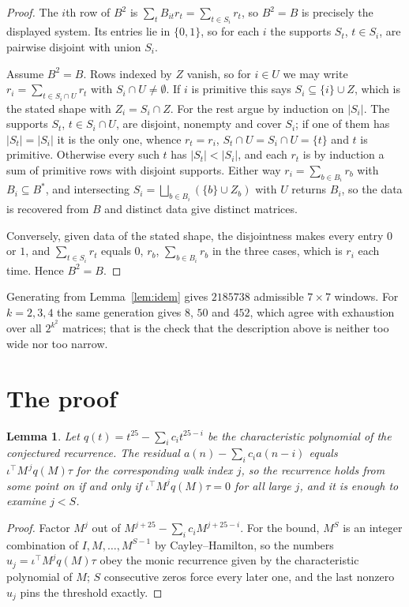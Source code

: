\documentclass[11pt,a4paper]{article}
\theoremstyle{plain}
\newtheorem{lemma}[theorem]{Lemma}
\theoremstyle{definition}
\begin{document}
\begin{proof}
The $i$th row of $B^2$ is $\sum_t B_{it}r_t=\sum_{t\in S_i}r_t$, so $B^2=B$ is precisely the
displayed system. Its entries lie in $\{0,1\}$, so for each $i$ the supports $S_t$,
$t\in S_i$, are pairwise disjoint with union $S_i$.

Assume $B^2=B$. Rows indexed by $Z$ vanish, so for $i\in U$ we may write
$r_i=\sum_{t\in S_i\cap U}r_t$ with $S_i\cap U\neq\emptyset$. If $i$ is primitive this says
$S_i\subseteq\{i\}\cup Z$, which is the stated shape with $Z_i=S_i\cap Z$. For the rest argue
by induction on $|S_i|$. The supports $S_t$, $t\in S_i\cap U$, are disjoint, nonempty and
cover $S_i$; if one of them has $|S_t|=|S_i|$ it is the only one, whence $r_t=r_i$,
$S_t\cap U=S_i\cap U=\{t\}$ and $t$ is primitive. Otherwise every such $t$ has
$|S_t|<|S_i|$, and each $r_t$ is by induction a sum of primitive rows with disjoint supports.
Either way $r_i=\sum_{b\in B_i}r_b$ with $B_i\subseteq B^{\ast}$, and intersecting
$S_i=\bigsqcup_{b\in B_i}(\{b\}\cup Z_b)$ with $U$ returns $B_i$, so the data is recovered
from $B$ and distinct data give distinct matrices.

Conversely, given data of the stated shape, the disjointness makes every entry $0$ or $1$, and
$\sum_{t\in S_i}r_t$ equals $0$, $r_b$, $\sum_{b\in B_i}r_b$ in the three cases, which is
$r_i$ each time. Hence $B^2=B$.
\end{proof}

Generating from Lemma~\ref{lem:idem} gives $2185738$ admissible $7\times7$ windows. For
$k=2,3,4$ the same generation gives $8$, $50$ and $452$, which agree with exhaustion over all
$2^{k^2}$ matrices; that is the check that the description above is neither too wide nor too
narrow.

\section{The proof}

\begin{lemma}\label{lem:crit}
Let $q(t)=t^{25}-\sum_i c_it^{25-i}$ be the characteristic polynomial of the
conjectured recurrence. The residual $a(n)-\sum_ic_ia(n-i)$ equals
$\iota^{\!\top}M^{\,j}q(M)\tau$ for the corresponding walk index $j$, so the recurrence
holds from some point on if and only if $\iota^{\!\top}M^{j}q(M)\tau=0$ for all large $j$,
and it is enough to examine $j<S$.
\end{lemma}

\begin{proof}
Factor $M^{j}$ out of $M^{j+25}-\sum_ic_iM^{j+25-i}$. For the bound, $M^{S}$
is an integer combination of $I,M,\dots,M^{S-1}$ by Cayley--Hamilton, so the numbers
$u_j=\iota^{\!\top}M^{j}q(M)\tau$ obey the monic recurrence given by the characteristic
polynomial of $M$; $S$ consecutive zeros force every later one, and the last nonzero $u_j$
pins the threshold exactly.
\end{proof}
\end{document}
